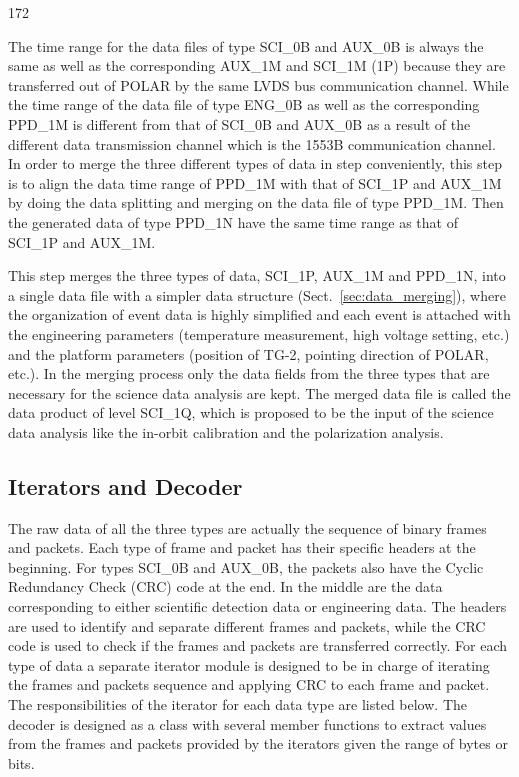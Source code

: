 \documentclass{raa}
\begin{document}
\begin{dingautolist}{172}
\item The time range for the data files of type SCI\_0B and AUX\_0B is always the same as well as the corresponding AUX\_1M and SCI\_1M (1P) because they are transferred out of POLAR by the same LVDS bus communication channel. While the time range of the data file of type ENG\_0B as well as the corresponding PPD\_1M is different from that of SCI\_0B and AUX\_0B as a result of the different data transmission channel which is the 1553B communication channel. In order to merge the three different types of data in step  conveniently, this step is to align the data time range of PPD\_1M with that of SCI\_1P and AUX\_1M by doing the data splitting and merging on the data file of type PPD\_1M. Then the generated data of type PPD\_1N have the same time range as that of SCI\_1P and AUX\_1M.
\item This step merges the three types of data, SCI\_1P, AUX\_1M and PPD\_1N, into a single data file with a simpler data structure (Sect.~\ref{sec:data_merging}), where the organization of event data is highly simplified and each event is attached with the engineering parameters (temperature measurement, high voltage setting, etc.) and the platform parameters (position of TG-2, pointing direction of POLAR, etc.). In the merging process only the data fields from the three types that are necessary for the science data analysis are kept. The merged data file is called the data product of level SCI\_1Q, which is proposed to be the input of the science data analysis like the in-orbit calibration and the polarization analysis.
\end{dingautolist}

\subsection{Iterators and Decoder}\label{sec:iterator_decoder}
The raw data of all the three types are actually the sequence of binary frames and packets. Each type of frame and packet has their specific headers at the beginning. For types SCI\_0B and AUX\_0B, the packets also have the Cyclic Redundancy Check (CRC) code at the end. In the middle are the data corresponding to either scientific detection data or engineering data. The headers are used to identify and separate different frames and packets, while the CRC code is used to check if the frames and packets are transferred correctly. For each type of data a separate iterator module is designed to be in charge of iterating the frames and packets sequence and applying CRC to each frame and packet. The responsibilities of the iterator for each data type are listed below. The decoder is designed as a class with several member functions to extract values from the frames and packets provided by the iterators given the range of bytes or bits.
\end{document}

